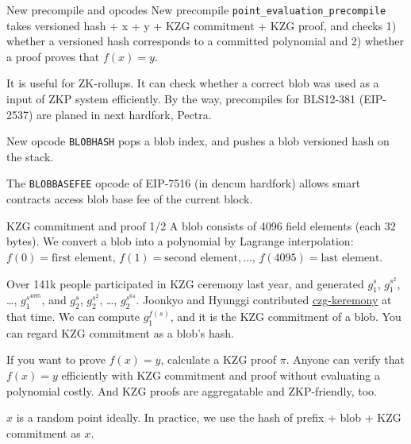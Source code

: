 \documentclass[10pt]{beamer}
\begin{document}
\begin{frame}[fragile]{New precompile and opcodes}
New precompile \texttt{point\_evaluation\_precompile} takes
  versioned hash + x + y + KZG commitment + KZG proof, and
  checks 1) whether a versioned hash corresponds to a committed
  polynomial and 2) whether a proof proves that $f(x) = y$.

It is useful for ZK-rollups. It can check whether a correct
  blob was used as a input of ZKP system efficiently.
  By the way, precompiles for BLS12-381 (EIP-2537) are planed in
  next hardfork, Pectra.

New opcode \texttt{BLOBHASH} pops a blob index, and pushes
  a blob versioned hash on the stack.

The \texttt{BLOBBASEFEE} opcode of EIP-7516 (in dencun hardfork)
allows smart contracts access blob base fee of the current block.
\end{frame}

\begin{frame}[fragile]{KZG commitment and proof 1/2}
A blob consists of 4096 field elements (each 32 bytes).
We convert a blob into a polynomial by Lagrange interpolation:
$f(0) = \text{first element},\,f(1) = \text{second element}, \ldots,\,f(4095) = \text{last element}$.

Over 141k people participated in KZG ceremony last year, and
generated $g_1^s$, $g_1^{s^2}$, \ldots, $g_1^{s^{4095}}$, and
$g_2^s$, $g_2^{s^2}$, \ldots, $g_2^{s^{64}}$. Joonkyo and Hyunggi contributed
\href{https://github.com/dsrvlabs/czg-keremony}{czg-keremony} at that time.
We can compute $g_1^{f(s)}$, and it is the KZG commitment of a blob.
You can regard KZG commitment as a blob's hash.

If you want to prove $f(x) = y$, calculate a KZG proof $\pi$.
Anyone can verify that $f(x) = y$ efficiently with KZG commitment and proof
without evaluating a polynomial costly.
And KZG proofs are aggregatable and ZKP-friendly, too.

$x$ is a random point ideally. In practice, we use the hash of
prefix + blob + KZG commitment as $x$.
\end{frame}
\end{document}
